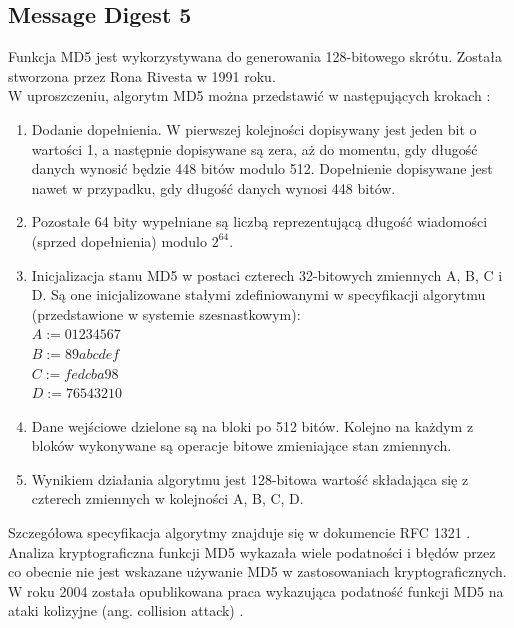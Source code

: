 \subsection{Message Digest 5}
Funkcja MD5 jest wykorzystywana do generowania 128-bitowego skrótu. Została stworzona przez Rona Rivesta w 1991 roku. \\
W uproszczeniu, algorytm MD5 można przedstawić w następujących krokach \cite{crypto101}:
\begin{enumerate}
	\item Dodanie dopełnienia. W pierwszej kolejności dopisywany jest jeden bit o wartości 1, a następnie dopisywane są zera, aż do momentu, gdy długość danych wynosić będzie 448 bitów modulo 512. Dopełnienie dopisywane jest nawet w przypadku, gdy długość danych wynosi 448 bitów.
	\item Pozostałe 64 bity wypełniane są liczbą reprezentującą długość wiadomości (sprzed dopełnienia) modulo $2^{64}$. 
	\item Inicjalizacja stanu MD5 w postaci czterech 32-bitowych zmiennych A, B, C i D. Są one inicjalizowane stałymi zdefiniowanymi w specyfikacji algorytmu (przedstawione w systemie szesnastkowym): \\
		$A := 01 23 45 67$ \\
		$B := 89 ab cd ef$ \\
		$C := fe dc ba 98$ \\
		$D := 76 54 32 10$ 
	\item Dane wejściowe dzielone są na bloki po 512 bitów. Kolejno na każdym z bloków wykonywane są operacje bitowe zmieniające stan zmiennych. 
	\item Wynikiem działania algorytmu jest 128-bitowa wartość składająca się z czterech zmiennych w kolejności A, B, C, D.
\end{enumerate} 
Szczegółowa specyfikacja algorytmy znajduje się w dokumencie RFC 1321 \cite{md5rfc}. \\
Analiza kryptograficzna funkcji MD5 wykazała wiele podatności i błędów przez co obecnie nie jest wskazane używanie MD5 w zastosowaniach kryptograficznych. 
W roku 2004 została opublikowana praca wykazująca podatność funkcji MD5 na ataki kolizyjne (ang. collision attack) \cite{md5cert}. 

